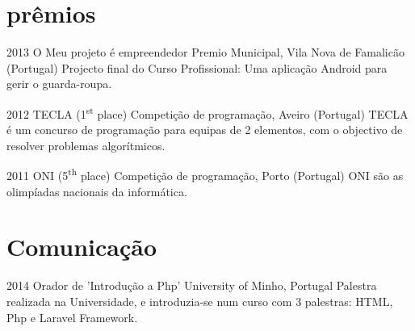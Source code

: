 \documentclass[]{friggeri-cv} %
\begin{document}
\section{prêmios}

\begin{entrylist}
\entry
{2013}
{O Meu projeto é empreendedor}
{Premio Municipal, Vila Nova de Famalicão (Portugal)}
{Projecto final do Curso Profissional: Uma aplicação Android para gerir o guarda-roupa.}

\entry
{2012}
{TECLA (1\textsuperscript{st} place)}
{Competição de programação, Aveiro (Portugal)}
{TECLA é um concurso de programação para equipas de 2 elementos, com o objectivo de resolver problemas algorítmicos.}

\entry
{2011}
{ONI (5\textsuperscript{th} place)}
{Competição de programação, Porto (Portugal)}
{ONI são as olimpíadas nacionais da informática.}

\end{entrylist}


\section{Comunicação}
\begin{entrylist}
    \entry
    {2014}
    {Orador de 'Introdução a Php'}
    {University of Minho, Portugal}
    {Palestra realizada na Universidade, e introduzia-se num curso com 3 palestras: HTML, Php e Laravel Framework.}
\end{entrylist}

\end{document}
